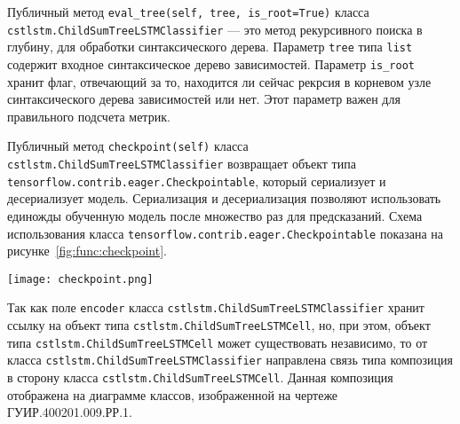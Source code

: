 Публичный метод \texttt{eval\_tree(self, tree, is\_root=True)} класса \texttt{cstlstm.ChildSumTreeLSTMClassifier} --- это метод рекурсивного поиска в глубину, для обработки синтаксического дерева. Параметр \texttt{tree} типа \texttt{list} содержит входное синтаксическое дерево зависимостей. Параметр \texttt{is\_root} хранит флаг, отвечающий за то, находится ли сейчас рекрсия в корневом узле синтаксического дерева зависимостей или нет. Этот параметр важен для правильного подсчета метрик.

Публичный метод \texttt{checkpoint(self)} класса \texttt{cstlstm.ChildSumTreeLSTMClassifier} возвращает объект типа \texttt{tensorflow.contrib.eager.Checkpointable}, который сериализует и десериализует модель. Сериализация и десериализация позволяют использовать единожды обученную модель после множество раз для предсказаний. Схема использования класса \texttt{tensorflow.contrib.eager.Checkpointable} показана на рисунке~\ref{fig:func:checkpoint}.

\begin{center}
  \texttt{[image: checkpoint.png]}
  \label{fig:func:checkpoint}
\end{center}

Так как поле \texttt{encoder} класса \texttt{cstlstm.ChildSumTreeLSTMClassifier} хранит ссылку на объект типа \texttt{cstlstm.ChildSumTreeLSTMCell}, но, при этом, объект типа \texttt{cstlstm.ChildSumTreeLSTMCell} может существовать независимо, то от класса \texttt{cstlstm.ChildSumTreeLSTMClassifier} направлена связь типа композиция в сторону класса \texttt{cstlstm.ChildSumTreeLSTMCell}. Данная композиция отображена на диаграмме классов, изображенной на чертеже ГУИР.400201.009.РР.1.

